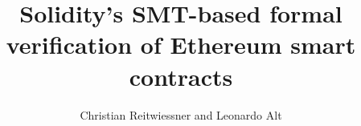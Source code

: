 \documentclass{llncs}
\begin{document}
\pagestyle{plain}

\title{Solidity's SMT-based formal verification of Ethereum smart contracts}

\author{Christian Reitwiessner and Leonardo Alt}
\maketitle











\end{document}
